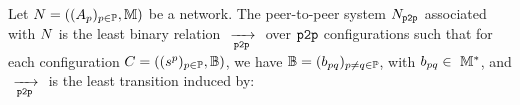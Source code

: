 \documentclass[submission,copyright,creativecommons,UKenglish]{eptcs}
\begin{document}
\begin{definition}\label{def:peerToPeerSystem}
 Let $\Network = \left((\Automaton{p})_{p\in \Part}, \messageSet\right)$ be a network.
The peer-to-peer system $\System{\Network}{\pp}{}$ associated with $\Network$  is the least binary relation
  $\TransitionAsync{}{}{}{\pp}{}$ over $\pp$ configurations
  such that
for each configuration $C = \left( (\state{s}{}{p})_{p \in \Part}, \bufferSet\right)$, we have 
 $\bufferSet = (b_{pq})_{p \neq q \in \Part}$, 
  with
  $b_{pq}\in~\messageSet^*$,
and 
$\TransitionAsync{}{}{}{\pp}{}$ is the least transition induced by: 
\begin{prooftree}
\end{prooftree}

\begin{prooftree}
\end{prooftree}
\end{definition}
\end{document}
